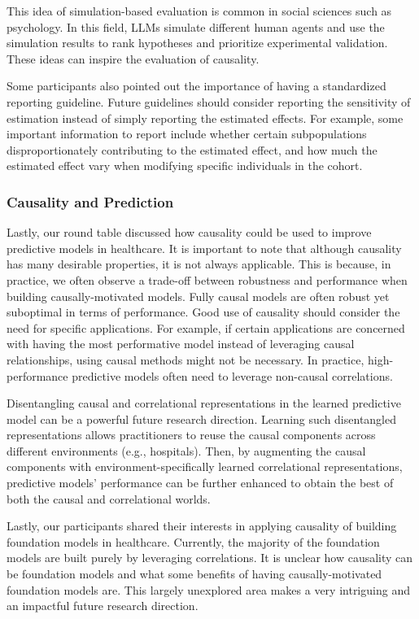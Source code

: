 This idea of simulation-based evaluation is common in social sciences such as psychology. In this field, LLMs simulate different human agents and use the simulation results to rank hypotheses and prioritize experimental validation. 
These ideas can inspire the evaluation of causality. 

Some participants also pointed out the importance of having a standardized reporting guideline. Future guidelines should consider reporting the sensitivity of estimation instead of simply reporting the estimated effects. For example, some important information to report include whether certain subpopulations disproportionately contributing to the estimated effect, and how much the estimated effect vary when modifying specific individuals in the cohort.

\subsubsection{Causality and Prediction}

Lastly, our round table discussed how causality could be used to improve predictive models in healthcare. It is important to note that although causality has many desirable properties, it is not always applicable. This is because, in practice, we often observe a trade-off between robustness and performance when building causally-motivated models. Fully causal models are often robust yet suboptimal in terms of performance. Good use of causality should consider the need for specific applications. For example, if certain applications are concerned with having the most performative model instead of leveraging causal relationships, using causal methods might not be necessary. In practice, high-performance predictive models often need to leverage non-causal correlations.

Disentangling causal and correlational representations in the learned predictive model can be a powerful future research direction. Learning such disentangled representations allows practitioners to reuse the causal components across different environments (e.g., hospitals). Then, by augmenting the causal components with environment-specifically learned correlational representations, predictive models' performance can be further enhanced to obtain the best of both the causal and correlational worlds.

Lastly, our participants shared their interests in applying causality of building foundation models in healthcare. Currently, the majority of the foundation models are built purely by leveraging correlations. It is unclear how causality can be foundation models and what some benefits of having causally-motivated foundation models are. This largely unexplored area makes a very intriguing and an impactful future research direction. 